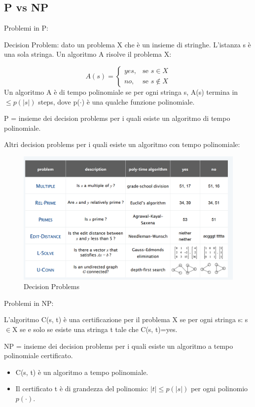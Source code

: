 \documentclass{article}
\begin{document}
\subsection{P vs NP}
Problemi in P:

\noindent Decision Problem: dato un problema X che è un insieme di stringhe. L'istanza s è una sola stringa. Un algoritmo A risolve il problema X: 

\noindent \[
A(s) =\begin{cases}yes, & \mbox{se }s\in X \\ no, & \mbox{se } s \notin X
\end{cases}
\]
Un algoritmo A è di tempo polinomiale se per ogni stringa s, A(s) termina in $\leq p(|s|)$ steps, dove p($\cdot$) è una qualche funzione polinomiale.

\noindent P = insieme dei decision problems per i quali esiste un algoritmo di tempo polinomiale.

\noindent Altri decision problems per i quali esiste un algoritmo con tempo polinomiale:
\begin{figure}[H]
    \centering
    \includegraphics[width=0.5\linewidth]{decisionProblems.png}
    \caption{Decision Problems}
    \label{fig:enter-label}
\end{figure}

\noindent Problemi in NP:

\noindent L'algoritmo C(s, t) è una certificazione per il problema X se per ogni stringa s: s$\in$X se e solo se esiste una stringa t tale che C(s, t)=yes.

\noindent NP = insieme dei decision problems per i quali esiste un algoritmo a tempo polinomiale certificato.

\begin{itemize}
    \item C(s, t) è un algoritmo a tempo polinomiale.
    \item  Il certificato t è di grandezza del polinomio: $|t| \leq p(|s|)$ per ogni polinomio $p(\cdot)$.
\end{itemize}
\end{document}
